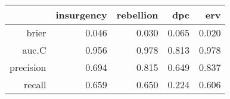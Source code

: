 \begin{tabular}{rrrrr}
  \hline
 & insurgency & rebellion & dpc & erv \\ 
  \hline
brier & 0.046 & 0.030 & 0.065 & 0.020 \\ 
  auc.C & 0.956 & 0.978 & 0.813 & 0.978 \\ 
  precision & 0.694 & 0.815 & 0.649 & 0.837 \\ 
  recall & 0.659 & 0.650 & 0.224 & 0.606 \\ 
   \hline
\end{tabular}
